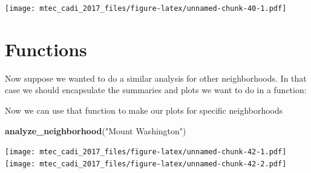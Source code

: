 \documentclass[]{book}
\newenvironment{Shaded}{\begin{snugshade}}{\end{snugshade}}
\newcommand{\KeywordTok}[1]{\textcolor[rgb]{0.13,0.29,0.53}{\textbf{#1}}}
\newcommand{\DataTypeTok}[1]{\textcolor[rgb]{0.13,0.29,0.53}{#1}}
\newcommand{\StringTok}[1]{\textcolor[rgb]{0.31,0.60,0.02}{#1}}
\newcommand{\ControlFlowTok}[1]{\textcolor[rgb]{0.13,0.29,0.53}{\textbf{#1}}}
\newcommand{\OperatorTok}[1]{\textcolor[rgb]{0.81,0.36,0.00}{\textbf{#1}}}
\newcommand{\NormalTok}[1]{#1}
\theoremstyle{definition}
\theoremstyle{definition}
\theoremstyle{remark}
\begin{document}
\texttt{[image: mtec\_cadi\_2017\_files/figure-latex/unnamed-chunk-40-1.pdf]}

\section{Functions}\label{functions}

Now suppose we wanted to do a similar analysis for other neighborhoods.
In that case we should encapsulate the summaries and plots we want to do
in a function:

\begin{Shaded}
\end{Shaded}

Now we can use that function to make our plots for specific
neighborhoods

\begin{Shaded}
\begin{Highlighting}[]
\KeywordTok{analyze_neighborhood}\NormalTok{(}\StringTok{"Mount Washington"}\NormalTok{)}
\end{Highlighting}
\end{Shaded}

\texttt{[image: mtec\_cadi\_2017\_files/figure-latex/unnamed-chunk-42-1.pdf]}
\texttt{[image: mtec\_cadi\_2017\_files/figure-latex/unnamed-chunk-42-2.pdf]}
\end{document}
